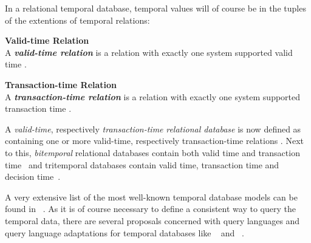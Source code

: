 In a relational temporal database, temporal values will of course be in the tuples of the extentions of temporal relations:

\begin{svgraybox}
\vspace{-10pt}
\begin{definition}\textbf{Valid-time Relation}\\
A \emph{\textbf{valid-time relation}} is a relation with exactly one system supported valid time \cite{Dyreson1994}.
\end{definition}

\begin{definition}\textbf{Transaction-time Relation}\\
A \emph{\textbf{transaction-time relation}} is a relation with exactly one system supported transaction time \cite{Dyreson1994}.
\end{definition}
\vspace{-10pt}
\end{svgraybox}

A \emph{valid-time}, respectively \emph{transaction-time} \emph{relational database} is now defined as containing one or more valid-time, respectively transaction-time relations \cite{Dyreson1994}. Next to this, \emph{bitemporal} relational databases contain both valid time and transaction time~\cite{Dyreson1994} and tritemporal databases contain valid time, transaction time and decision time~\cite{Nascimento95decisiontime}.




A very extensive list of the most well-known temporal database models can be found in ~\cite{Yu1998}. As it is of course necessary to define a consistent way to query the temporal data, there are several proposals concerned with query languages and query language adaptations for temporal databases like ~\cite{TSQL} and ~\cite{Snodgrass98}.







